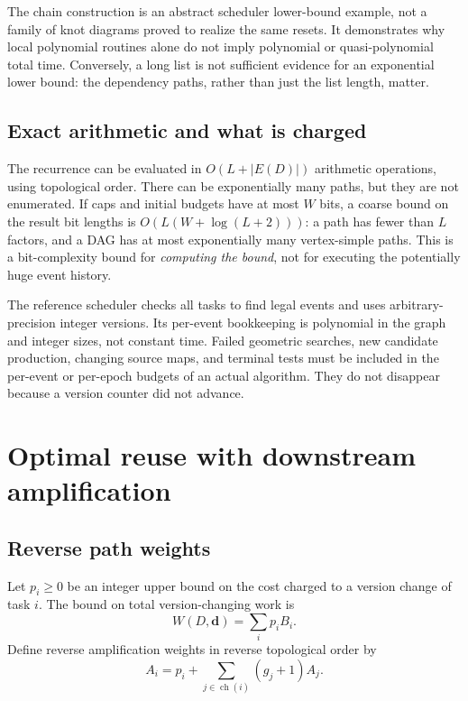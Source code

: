 \documentclass[11pt]{article}
\theoremstyle{definition}
\newcommand{\children}{\operatorname{ch}}
\begin{document}
The chain construction is an abstract scheduler lower-bound example, not a family of knot diagrams proved to realize the same resets. It demonstrates why local polynomial routines alone do not imply polynomial or quasi-polynomial total time. Conversely, a long list is not sufficient evidence for an exponential lower bound: the dependency paths, rather than just the list length, matter.

\subsection{Exact arithmetic and what is charged}
The recurrence can be evaluated in $O(L+|E(D)|)$ arithmetic operations, using topological order. There can be exponentially many paths, but they are not enumerated. If caps and initial budgets have at most $W$ bits, a coarse bound on the result bit lengths is $O(L(W+\log(L+2)))$: a path has fewer than $L$ factors, and a DAG has at most exponentially many vertex-simple paths. This is a bit-complexity bound for \emph{computing the bound}, not for executing the potentially huge event history.

The reference scheduler checks all tasks to find legal events and uses arbitrary-precision integer versions. Its per-event bookkeeping is polynomial in the graph and integer sizes, not constant time. Failed geometric searches, new candidate production, changing source maps, and terminal tests must be included in the per-event or per-epoch budgets of an actual algorithm. They do not disappear because a version counter did not advance.

\section{Optimal reuse with downstream amplification}\label{sec:amplification}
\subsection{Reverse path weights}
Let $p_i\geq0$ be an integer upper bound on the cost charged to a version change of task $i$. The bound on total version-changing work is
\[
 W(D,\boldsymbol d)=\sum_i p_iB_i.
\]
Define reverse amplification weights in reverse topological order by
\begin{equation}\label{eq:reverse}
 A_i=p_i+\sum_{j\in\children(i)}(g_j+1)A_j.
\end{equation}
\end{document}
